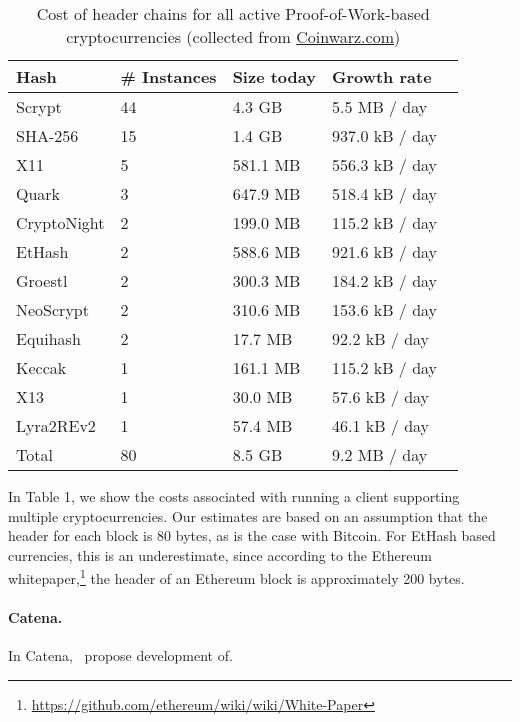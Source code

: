 \begin{table}
  \caption{Cost of header chains for all active Proof-of-Work-based cryptocurrencies (collected from \url{Coinwarz.com})}
\small
  \begin{tabular}{l|l|l|l}
    {\bf Hash} & {\bf \# Instances} & {\bf Size today} & {\bf Growth rate}  \\
    \hline
    Scrypt  & 44  & 4.3 GB  & 5.5 MB / day \  \\
    SHA-256  & 15  & 1.4 GB  & 937.0 kB / day \  \\
    X11  & 5  & 581.1 MB  & 556.3 kB / day \  \\
    Quark  & 3  & 647.9 MB  & 518.4 kB / day \  \\
    CryptoNight  & 2  & 199.0 MB  & 115.2 kB / day \  \\
    EtHash  & 2  & 588.6 MB  & 921.6 kB / day \  \\
    Groestl  & 2  & 300.3 MB  & 184.2 kB / day \  \\
    NeoScrypt  & 2  & 310.6 MB  & 153.6 kB / day \  \\
    Equihash  & 2  & 17.7 MB  & 92.2 kB / day \  \\
    Keccak  & 1  & 161.1 MB  & 115.2 kB / day \  \\
    X13  & 1  & 30.0 MB  & 57.6 kB / day \  \\
    Lyra2REv2  & 1  & 57.4 MB  & 46.1 kB / day \  \\
    \hline
    Total  & 80   &  8.5 GB  & 9.2 MB  / day  \\
  \end{tabular}
\end{table}

In Table 1, we show the costs associated with running a client supporting multiple cryptocurrencies. Our estimates are based on an assumption that the header for each block is 80 bytes, as is the case with Bitcoin. For EtHash based currencies, this is an underestimate, since according to the Ethereum whitepaper,\footnote{\url{https://github.com/ethereum/wiki/wiki/White-Paper}}
the header of an Ethereum block is approximately 200 bytes.

\paragraph{Catena.}

In Catena,~\cite{} propose development of.


